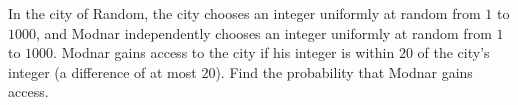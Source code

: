 In the city of Random, the city chooses an integer uniformly at random from $1$ to $1000$, and Modnar independently chooses an integer uniformly at random from $1$ to $1000$. Modnar gains access to the city if his integer is within $20$ of the city's integer (a difference of at most $20$). Find the probability that Modnar gains access.
